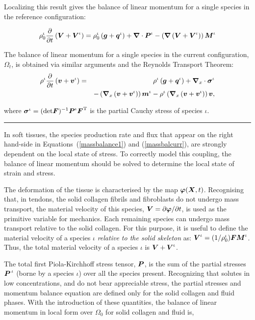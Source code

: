 \noindent Localizing this result gives the balance of linear
momentum for a single species in the reference configuration:

\begin{equation}
\rho_0^\iota\frac{\partial}{\partial t}\left(\mbox{\boldmath$ V$}+\mbox{\boldmath$ V$}^\iota\right)
= \rho^\iota_0\left(\mbox{\boldmath$ g$}+\mbox{\boldmath$ q$}^\iota\right) +
\mbox{\boldmath$\nabla$}\cdot\mbox{\boldmath$ P$}^\iota-\left(\mbox{\boldmath$\nabla$}\left(\mbox{\boldmath$ V$}+\mbox{\boldmath$ V$}^\iota\right)\right)\mbox{\boldmath$ M$}^\iota
\label{ballinmomrefI}
\end{equation}

The balance of linear momentum for a single species in the current
configuration, $\Omega_t$, is obtained via similar arguments and
the Reynolds Transport Theorem:
\begin{eqnarray}
\rho^\iota\frac{\partial}{\partial t}\left(\mbox{\boldmath$ v$}+\mbox{\boldmath$ v$}^\iota\right)
&=& \rho^\iota\left(\mbox{\boldmath$ g$}+\mbox{\boldmath$ q$}^\iota\right) +
\mbox{\boldmath$\nabla$}_x\cdot\mbox{\boldmath$\sigma$}^\iota\nonumber\\
& & - \left(\mbox{\boldmath$\nabla$}_x\left(\mbox{\boldmath$ v$}+\mbox{\boldmath$ v$}^\iota\right)\right)\mbox{\boldmath$ m$}^\iota -
\rho^\iota\left(\mbox{\boldmath$\nabla$}_x\left(\mbox{\boldmath$ v$}+\mbox{\boldmath$ v$}^\iota\right)\right)\mbox{\boldmath$ v$},
\label{ballinmomcurrI}
\end{eqnarray}

\noindent where $\mbox{\boldmath$\sigma$}^\iota =
(\mathrm{det}\mbox{\boldmath$ F$})^{-1}\mbox{\boldmath$ P$}^\iota\mbox{\boldmath$ F$}^\mathrm{T}$ is the partial
Cauchy stress of species $\iota$.

\hrule

In soft tissues, the species production rate and flux that appear on
the right hand-side in Equations~(\ref{massbalance1}) and
(\ref{massbalcurr}), are strongly 
dependent on the local state of stress. To correctly model this
coupling, the balance of linear momentum should be solved to determine
the local state of strain and stress.

The deformation of the tissue is characterised by the map
$\mbox{\boldmath$\varphi$}(\mbox{\boldmath$ X$},t)$. Recognising that, in tendons, the solid collagen
fibrils and fibroblasts do not undergo mass
transport, the material velocity of this species, $\mbox{\boldmath$ V$} =
\partial\mbox{\boldmath$\varphi$}/\partial t$, is used as the primitive variable for
mechanics. Each remaining species can undergo mass transport relative
to the solid collagen. For this purpose, it is useful to define the
material velocity of a 
species $\iota$ \emph{relative to the solid skeleton} as: $\mbox{\boldmath$ V$}^\iota =
(1/\rho_0^\iota)\mbox{\boldmath$ F$}\mbox{\boldmath$ M$}^\iota$. Thus, the total material velocity of a
species $\iota$ is $\mbox{\boldmath$ V$}+\mbox{\boldmath$ V$}^\iota$.

The total first Piola-Kirchhoff stress tensor, $\mbox{\boldmath$ P$}$, is the sum of
the partial stresses $\mbox{\boldmath$ P$}^{\,\iota}$ (borne by a species $\iota$) over all
the species present. Recognizing that solutes in low concentrations,
and do not bear 
  appreciable stress, the partial stresses and momentum balance
  equation are defined only for the solid collagen and fluid
  phases. With the introduction 
  of these quantities, the 
balance of linear momentum in local form over $\Omega_0$ for solid
collagen and fluid is,

